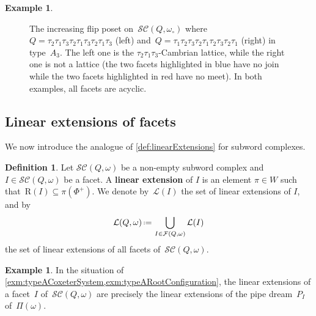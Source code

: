 \documentclass[reqno]{amsart}
\theoremstyle{definition}
\newtheorem{definition}[theorem]{Definition}
\newtheorem{example}[theorem]{Example}
\newcommand{\eqdef}{\mbox{\,\raisebox{0.2ex}{\scriptsize\ensuremath{\mathrm:}}\ensuremath{=}\,}} %
\newcommand{\red}[1]{{\color{red} #1}} %
\newcommand{\defn}[1]{\textbf{\textsf{\color{PineGreen} #1}}} %
\newcommand{\pipeDreams}{\Pi} %
\newcommand{\linearExtensions}{\mathcal{L}} %
\newcommand{\wo}{\omega_\circ} %
\newcommand{\subwordComplex}{\mathcal{SC}} %
\newcommand{\Roots}{\mathrm{R}} %
\newcommand{\subwordFacets}{\mathcal{F}} %
\begin{document}
\begin{example}
\begin{figure}[t]
{
	}
	\caption{The increasing flip poset on~$\subwordComplex(Q, \wo)$ where~$Q = \tau_2 \tau_1 \tau_3 \tau_2 \tau_1 \tau_3 \tau_2 \tau_1 \tau_3$ (left) and~$Q = \tau_1 \tau_2 \tau_3 \tau_2 \tau_1 \tau_2 \tau_3 \tau_2 \tau_1$ (right) in type~$A_3$. The left one is the $\tau_2 \tau_1 \tau_3$-Cambrian lattice, while the right one is not a lattice (the two facets highlighted in blue have no join while the two facets highlighted in red have no meet). In both examples, all facets are acyclic.}
	\label{fig:increasingFlipPosets}
\end{figure}
\end{example}


\pagebreak
\subsection{Linear extensions of facets}
\label{subsec:linearExtensionsFacets}

We now introduce the analogue of \cref{def:linearExtensions} for subword complexes.

\begin{definition}
\label{def:linearExtensionsSubwordComplexes}
Let $\subwordComplex(Q,\omega)$ be a non-empty subword complex and $I\in \subwordComplex(Q,\omega)$ be a facet.
A \defn{linear extension} of $I$ is an element $\pi \in W$ such that~$\Roots(I) \subseteq \pi(\Phi^+)$.
We denote by~$\linearExtensions(I)$ the set of linear extensions of $I$, and by
\[
\linearExtensions(Q,\omega) \eqdef \bigcup_{I\in\subwordFacets(Q,\omega)} \linearExtensions(I)
\]
the set of linear extensions of all facets of~$\subwordComplex(Q,\omega)$.
\end{definition}

\begin{example}
In the situation of \cref{exm:typeACoxeterSystem,exm:typeARootConfiguration}, the linear extensions of a facet~$I$ of~$\subwordComplex(Q, \omega)$ are precisely the linear extensions of the pipe dream~$P_I$ of~$\pipeDreams(\omega)$.
\end{example}
\end{document}
